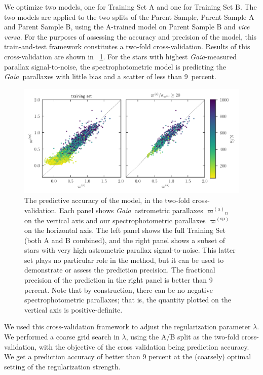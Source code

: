 \documentclass[modern]{aastex62}
\newcommand{\foreign}[1]{\textsl{#1}}
\newcommand{\project}[1]{\textsl{#1}}
\newcommand{\gaia}{\project{Gaia}}
\newcommand{\gparallax}{{\varpi^{(\mathrm{a})}}}
\newcommand{\sparallax}{{\varpi^{(\mathrm{sp})}}}
\begin{document}
We optimize two models, one for Training Set A and one for Training Set B.
The two models are applied to the two splits of the Parent Sample, Parent Sample
A and Parent Sample B, using the A-trained model on Parent Sample B and
\foreign{vice versa}.
For the purposes of assessing the accuracy and precision of the model, this
train-and-test framework constitutes a two-fold cross-validation.
Results of this cross-validation are shown in \figurename~\ref{fig:xval}.
For the stars with highest \gaia-measured parallax signal-to-noise,
the spectrophotometric model is predicting the \gaia\ parallaxes with little bias
and a scatter of less than 9~percent.
\begin{figure}
\includegraphics[width=\textwidth]{residuals.pdf}
\caption{The predictive accuracy of the model, in the two-fold cross-validation.
  Each panel shows \gaia\ astrometric parallaxes $\gparallax_n$ on the vertical axis
  and our spectrophotometric parallaxes $\sparallax$ on the horizontal axis.
  The left panel shows the full Training Set (both A and B combined),
  and the right panel shows a
  subset of stars with very high astrometric parallax signal-to-noise. This latter
  set plays no particular role in the method, but it can be used to demonstrate or
  assess the prediction precision. The fractional precision of the prediction in the
  right panel is better than 9 percent. Note that by construction, there can be no negative
  spectrophotometric parallaxes; that is, the quantity plotted on the vertical axis is
  positive-definite.\label{fig:xval}}
\end{figure}

We used this cross-validation framework to adjust the regularization parameter $\lambda$.
We performed a coarse grid search in $\lambda$,
using the A/B split as the two-fold cross-validation, with the objective
of the cross validation being prediction accuracy.
We get a prediction accuracy of better than 9 percent 
at the (coarsely) optimal setting of the regularization strength.
\end{document}
